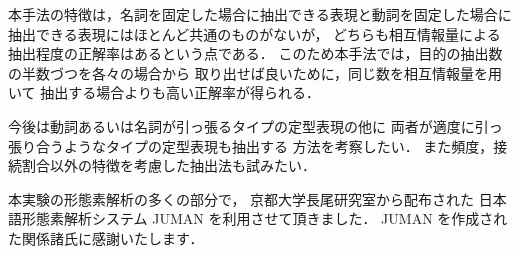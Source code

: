 本手法の特徴は，名詞を固定した場合に抽出できる表現と動詞を固定した場合に
抽出できる表現にはほとんど共通のものがないが，
どちらも相互情報量による抽出程度の正解率はあるという点である．
このため本手法では，目的の抽出数の半数づつを各々の場合から
取り出せば良いために，同じ数を相互情報量を用いて
抽出する場合よりも高い正解率が得られる．

今後は動詞あるいは名詞が引っ張るタイプの定型表現の他に
両者が適度に引っ張り合うようなタイプの定型表現も抽出する
方法を考察したい．
また頻度，接続割合以外の特徴を考慮した抽出法も試みたい．


\acknowledgment

本実験の形態素解析の多くの部分で，
京都大学長尾研究室から配布された
日本語形態素解析システム JUMAN を利用させて頂きました．
JUMAN を作成された関係諸氏に感謝いたします．








\begin{biography}



\end{biography}



